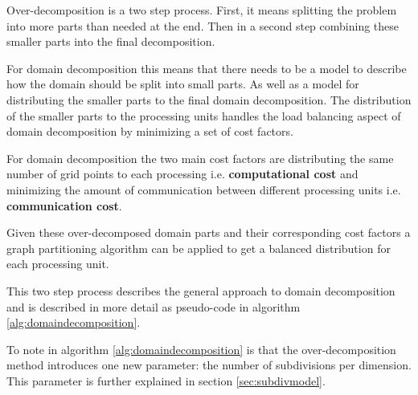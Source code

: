 Over-decomposition is a two step process.
First, it means splitting the problem into more parts than needed at the end.
Then in a second step combining these smaller parts into the final decomposition.

For domain decomposition this means that there needs to be a model to describe how the domain should be split into small parts.
As well as a model for distributing the smaller parts to the final domain decomposition.
The distribution of the smaller parts to the processing units handles the load balancing aspect of domain decomposition by minimizing a set of cost factors.

For domain decomposition the two main cost factors are distributing the same number of grid points to each processing i.e. \textbf{computational cost} and minimizing the amount of communication between different processing units i.e. \textbf{communication cost}.

Given these over-decomposed domain parts and their corresponding cost factors a graph partitioning algorithm can be applied to get a balanced distribution for each processing unit.

This two step process describes the general approach to domain decomposition and is described in more detail as pseudo-code in algorithm \ref{alg:domaindecomposition}.

To note in algorithm \ref{alg:domaindecomposition} is that the over-decomposition method introduces one new parameter: the number of subdivisions per dimension.
This parameter is further explained in section \ref{sec:subdivmodel}.

